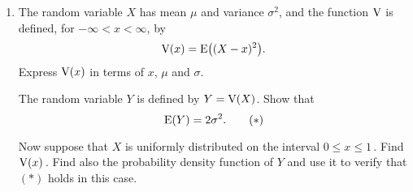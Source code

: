 \documentclass[a4, 11pt]{report}
\newlength{\qspace}
\newcounter{qnumber}
\newenvironment{question}%
 {\vspace{\qspace}
  \begin{enumerate}[\bfseries 1\quad][10]%
    \setcounter{enumi}{\value{qnumber}}%
    \item%
 }
{
  \end{enumerate}
  \filbreak
  \stepcounter{qnumber}
 }
\DeclareMathOperator{\Var}{Var}
\def\E{{\rm E}}
\def\le{\leqslant}
\begin{document}

\begin{question}
The random variable $X$ has mean $\mu$ and 
variance $\sigma^2$, and  the function ${\rm V}$
is defined, for $-\infty<x<\infty$,   by
\[
{\rm V}(x) = \E \big( (X-x)^2\big)
.
\]
Express ${\rm V}(x)$ in terms of $x$, $ \mu$ and $\sigma$.


The random variable $Y$ is defined by $Y={\rm V}(X)$.
Show that 
\[
\E(Y) = 2 \sigma^2
.
\tag{$*$}
\]

Now suppose that $X$ is uniformly distributed on the interval $0\le x \le1\,$.
Find ${\rm V}(x)\,$. 
Find also the probability density function of $Y\!$ and use it to
verify that $(*)$ holds in this case.
\end{question}
\end{document}
